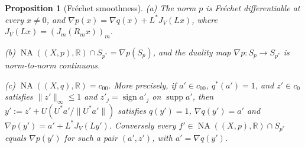 \documentclass[10pt]{amsart}
\newtheorem{proposition}[theorem]{Proposition}
\theoremstyle{definition}
\theoremstyle{remark}
\newcommand{\NA}{\operatorname{NA}}
\newcommand{\supp}{\operatorname{supp}}
\newcommand{\sgn}{\operatorname{sign}}
\newcommand{\R}{\mathbb R}
\begin{document}
\begin{proposition}[Fr\'echet smoothness]\label{prop:smooth}
\textup{(a)} The norm $p$ is Fr\'echet differentiable at every $x\neq0$,
and $\nabla p(x)=\nabla q(x)+L^*J_V(Lx)$, where $J_V(Lx)=(J_m(R_mx))_m$.

\textup{(b)} $\NA((X,p),\R)\cap S_{p^*}=\nabla p(S_p)$, and the duality map
$\nabla p:S_p\to S_{p^*}$ is norm-to-norm continuous.

\textup{(c)} $\NA((X,q),\R)=c_{00}$.  More precisely, if $a'\in c_{00}$,
$q^*(a')=1$, and $z'\in c_0$ satisfies $\|z'\|_\infty\le1$ and
$z'_j=\sgn a'_j$ on $\supp a'$, then $y':=z'+U(U^*a'/\|U^*a'\|)$ satisfies
$q(y')=1$, $\nabla q(y')=a'$ and $\nabla p(y')=a'+L^*J_V(Ly')$.
Conversely every $f'\in\NA((X,p),\R)\cap S_{p^*}$ equals $\nabla p(y')$ for
such a pair $(a',z')$, with $a'=\nabla q(y')$.
\end{proposition}
\end{document}
